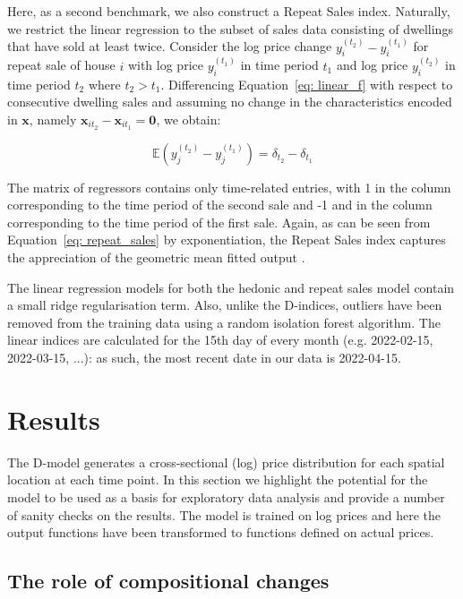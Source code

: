 Here, as a second benchmark, we also construct a Repeat Sales index. Naturally, we restrict the linear regression to the subset of sales data consisting of dwellings that have sold at least twice. Consider the log price change $y^{(t_2)}_i-y^{(t_1)}_i$ for repeat sale of house $i$ with log price $y^{(t_1)}_i$ in time period $t_1$ and log price $y^{(t_2)}_i$ in time period $t_2$ where $t_2>t_1$. Differencing Equation~\ref{eq: linear_f} with respect to consecutive dwelling sales and assuming no change in the characteristics encoded in $\mathbf{x}$, namely $\mathbf{x}_{it_2} - \mathbf{x}_{it_1} = \mathbf{0}$, we obtain:

\begin{equation}
  \label{eq: repeat_sales}
 \mathbb{E}(y^{(t_2)}_j-y^{(t_1)}_j) =  \delta_{t_2}-\delta_{t_1}
  \end{equation}

The matrix of regressors contains only time-related entries, with 1 in the column corresponding to the time period of the second sale and -1 and in the column corresponding to the time period of the first sale. 
Again, as can be seen from Equation~\ref{eq: repeat_sales} by exponentiation, the Repeat Sales index captures the appreciation of the geometric mean fitted output \citep[see also][]{shiller:1991}. 

The linear regression models for both the hedonic and repeat sales model contain a small ridge regularisation term. Also, unlike the D-indices, outliers have been removed from the training data using a random isolation forest algorithm. The linear indices are calculated for the 15th day of every month (e.g. 2022-02-15, 2022-03-15, ...): as such, the most recent date in our data is 2022-04-15.


\section{Results}
\label{sec:results}

The D-model generates a cross-sectional (log) price distribution for each spatial location at each time point. In this section we highlight the potential for the model to be used as a basis for exploratory data analysis and provide a number of sanity checks on the results. The model is trained on log prices and here the output functions have been transformed to functions defined on actual prices.

\subsection{The role of compositional changes}
\label{sec:compositional}


